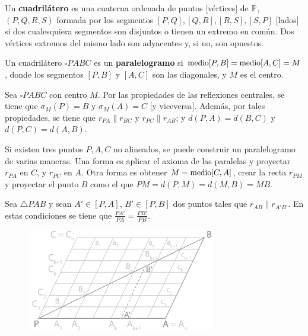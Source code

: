  Un \textbf{cuadrilátero} es una cuaterna ordenada de puntos [vértices] de $\P$, $(P, Q, R, S)$ formada por los segmentos $[P,Q], [Q,R], [R,S], [S,P]$ [lados] si dos cualesquiera segmentos son disjuntos o tienen un extremo en común. Dos vértices extremos del mismo lado son adyacentes y, si no, son opuestos.

 Un cuadrilátero $\square PABC$ es un \textbf{paralelogramo} si $\m[P,B] = \m[A,C] = M$, donde los segmentos $[P,B]$ y $[A,C]$ son las diagonales, y $M$ es el centro.

 Sea $\square PABC$ con centro $M$. Por las propiedades de las reflexiones centrales, se tiene que $\sigma_M(P) = B$ y $\sigma_M(A) = C$ [y viceversa]. Además, por tales propiedades, se tiene que $r_{PA} \parallel r_{BC}$ y $r_{PC} \parallel r_{AB}$; y $d(P,A) = d(B, C)$ y $d(P,C) = d(A,B)$. 

 Si existen tres puntos $P,A,C$ no alineados, se puede construir un paralelogramo de varias maneras. Una forma es aplicar el axioma de las paralelas y proyectar $r_{PA}$ en $C$, y $r_{PC}$ en $A$. Otra forma es obtener $M  = \m[C,A]$, crear la recta $r_{PM}$ y proyectar el punto $B$ como el que $PM = d(P,M) = d(M,B) = MB$.

\obligatorio{} Sea $\triangle PAB$ y sean $A' \in [P,A]$, $B' \in  [P,B]$ dos puntos tales que $r_{AB} \parallel r_{A'B'}$. En estas condiciones se tiene que $\frac{PA'}{PA} = \frac{PB'}{PB}$.

\begin{figure}[H]
	\centering
	\includegraphics[width=8.2cm]{figuras/5-5.png}
	\vspace{-1em}
\end{figure}

